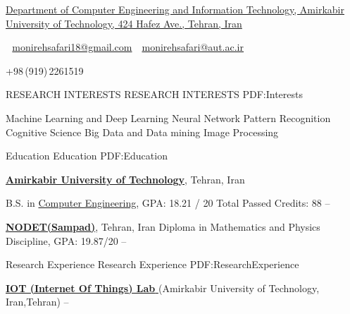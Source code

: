 \documentclass[letterpaper,MMMyyyy,nonstopmode]{simpleresumecv}
\newcommand{\CVAuthor}{ Monireh Safari}
\newcommand{\CVWebpage}{}
\begin{document}

\Title{\CVAuthor}

\begin{SubTitle}
\href{https://www.google.com/maps/place/Amirkabir+University+of+Technology+(Polytechnic}
{Department of Computer Engineering and Information Technology, Amirkabir University of Technology, 424 Hafez Ave., Tehran, Iran}
\par
\,\SubBulletSymbol\,
\href{monirehsafari18@gmail.com}
{monirehsafari18@gmail.com}
\,\SubBulletSymbol\,
\href{monirehsafari@aut.ac.ir}
{monirehsafari@aut.ac.ir}
\,\SubBulletSymbol\,

+98\,(919)\,2261519
\,\SubBulletSymbol\,
\href{\CVWebpage}
{\url{\CVWebpage}}
\end{SubTitle}

\begin{Body}

\Section
{RESEARCH INTERESTS}
{RESEARCH INTERESTS}
{PDF:Interests}

\Entry

\BulletItem
Machine Learning and Deep Learning
\BulletItem
Neural Network
\BulletItem
Pattern Recognition
\BulletItem
Cognitive Science
\BulletItem
Big Data and Data mining  
\BulletItem
Image Processing




\Section
{Education}
{Education}
{PDF:Education}

\Entry
\href{http://www.aut.ac.ir}
{\textbf{Amirkabir University of Technology}},
Tehran, Iran

\Gap
\BulletItem
B.S. in
\href{http://ceit.aut.ac.ir}
{Computer Engineering}, 
  GPA: 18.21 / 20
  Total Passed Credits: 88
\hfill
{} --  

\href{}
{\textbf{NODET(Sampad)}},
Tehran, Iran
\BulletItem
Diploma in Mathematics and Physics Discipline, 
GPA: 19.87/20
\hfill
{}--

\begin{Detail}

\end{Detail}


\BullENCE %

\Section
{Research Experience}
{Research Experience}
{PDF:ResearchExperience}

\Entry
\href{}
{\textbf{IOT (Internet Of Things) Lab }} 
\newline (Amirkabir University of Technology,
Iran,Tehran)
\hfill
{} --




\end{Body}
\end{document}
